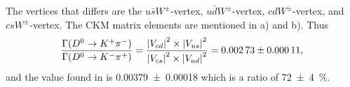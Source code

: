The vertices that differs are the $u \bar{s} W^\pm$-vertex, $u \bar{d} W^\pm$-vertex, $c d W^\pm$-vertex, and $c s W^\pm$-vertex. The CKM matrix elements are mentioned in a) and b). Thus
\begin{equation}
	\frac{\Gamma(D^0 \to K^+ \pi^-)}{\Gamma(D^0 \to K^- \pi^+)} = \frac{\abs{V_{cd}}^2 \times \abs{V_{us}}^2}{\abs{V_{cs}}^2 \times \abs{V_{ud}}^2} = \num{0.00273(11)},
\end{equation}
and the value found in \cite{particles} is \num{0.00379(18)} which is a ratio of \SI{72(4)}{\percent}.